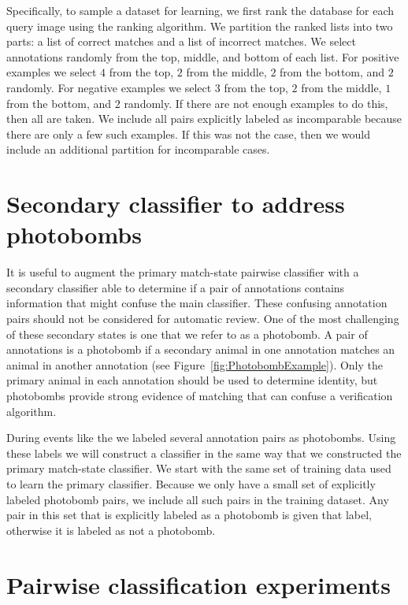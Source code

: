     Specifically, to sample a dataset for learning, we first rank the database for each query image using the
      ranking algorithm.
    We partition the ranked lists into two parts:
    a list of correct matches and a list of incorrect matches.
    We select annotations randomly from the top, middle, and bottom of each list.
    For positive examples we select $4$ from the top, $2$ from the middle, $2$ from the bottom, and $2$ randomly.
    For negative examples we select $3$ from the top, $2$ from the middle, $1$ from the bottom, and $2$ randomly.
    If there are not enough examples to do this, then all are taken.
    We include all pairs explicitly labeled as incomparable because there are only a few such examples.
    If this was not the case, then we would include an additional partition for incomparable cases.


\section{Secondary classifier to address photobombs}\label{sec:learnpb}
    It is useful to augment the primary match-state pairwise classifier with a secondary classifier able to
      determine if a pair of annotations contains information that might confuse the main classifier.
    These confusing annotation pairs should not be considered for automatic review.
    One of the most challenging of these secondary states is one that we refer to as a {photobomb}.
    A pair of annotations is a photobomb if a secondary animal in one annotation matches an animal in another
      annotation (\eg see Figure~\ref{fig:PhotobombExample}).
    Only the primary animal in each annotation should be used to determine identity, but photobombs provide
      strong evidence of matching that can confuse a verification algorithm.

    \PhotobombExample{}

    During events like the \GZC{} we labeled several annotation pairs as photobombs.
    Using these labels we will construct a classifier in the same way that we constructed the primary match-state
      classifier.
    We start with the same set of training data used to learn the primary classifier.
    Because we only have a small set of explicitly labeled photobomb pairs, we include all such pairs in the
      training dataset.
    Any pair in this set that is explicitly labeled as a photobomb is given that label, otherwise it is labeled
      as not a photobomb.

\section{Pairwise classification experiments}\label{sec:pairexpt}



